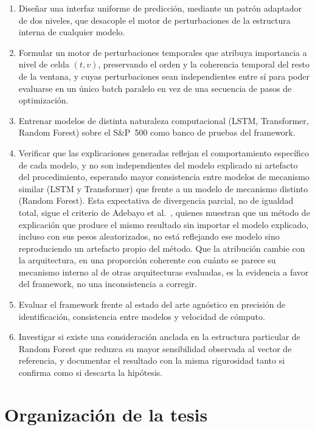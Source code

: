 \begin{enumerate}
    \item Diseñar una interfaz uniforme de predicción, mediante un patrón adaptador de dos niveles, que desacople el motor de perturbaciones de la estructura interna de cualquier modelo.
    \item Formular un motor de perturbaciones temporales que atribuya importancia a nivel de celda $(t,v)$, preservando el orden y la coherencia temporal del resto de la ventana, y cuyas perturbaciones sean independientes entre sí para poder evaluarse en un único batch paralelo en vez de una secuencia de pasos de optimización.
    \item Entrenar modelos de distinta naturaleza computacional (LSTM, Transformer, Random Forest) sobre el S\&P~500 como banco de pruebas del framework.
    \item Verificar que las explicaciones generadas reflejan el comportamiento específico de cada modelo, y no son independientes del modelo explicado ni artefacto del procedimiento, esperando mayor consistencia entre modelos de mecanismo similar (LSTM y Transformer) que frente a un modelo de mecanismo distinto (Random Forest). Esta expectativa de divergencia parcial, no de igualdad total, sigue el criterio de Adebayo et al.\ \cite{adebayo2018}, quienes muestran que un método de explicación que produce el mismo resultado sin importar el modelo explicado, incluso con sus pesos aleatorizados, no está reflejando ese modelo sino reproduciendo un artefacto propio del método. Que la atribución cambie con la arquitectura, en una proporción coherente con cuánto se parece su mecanismo interno al de otras arquitecturas evaluadas, es la evidencia a favor del framework, no una inconsistencia a corregir.
    \item Evaluar el framework frente al estado del arte agnóstico en precisión de identificación, consistencia entre modelos y velocidad de cómputo.
    \item Investigar si existe una consideración anclada en la estructura particular de Random Forest que reduzca su mayor sensibilidad observada al vector de referencia, y documentar el resultado con la misma rigurosidad tanto si confirma como si descarta la hipótesis.
\end{enumerate}

\section{Organización de la tesis}
\label{sec:organizacion_tesis}

